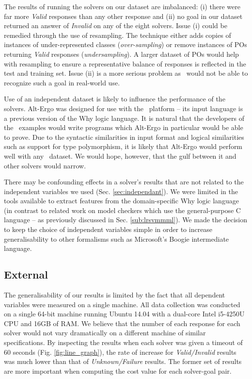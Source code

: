 The results of running the solvers on our dataset are imbalanced: (i) there were far more \textit{Valid} responses than any other response and (ii) no goal in our dataset returned an answer of \textit{Invalid} on any of the eight solvers. 
Issue (i) could be remedied through the use of resampling.
The technique either adds copies of instances of under-represented classes (\textit{over-sampling}) or remove instances of POs returning \textit{Valid} responses (\textit{undersampling}).
A larger dataset of POs would help with resampling to ensure a representative balance of responses is reflected in the test and training set. 
Issue (ii) is a more serious problem as \where~would not be able to recognize such a goal in real-world use. 

Use of an independent dataset is likely to influence the performance of the solvers. 
Alt-Ergo was designed for use with the \why~platform -- its input language is a previous version of the Why logic language. 
It is natural that the developers of the \why~examples would write programs which Alt-Ergo in particular would be able to prove. 
Due to the syntactic similarities in input format and logical similarities such as support for type polymorphism, it is likely that Alt-Ergo would perform well with any \why~dataset. We would hope, however, that the gulf between it and other solvers would narrow.

There may be confounding effects in a solver's results that are not related to the independent variables we used (Sec. \ref{sec:independant}). 
We were limited in the tools available to extract features from the domain-specific Why logic language (in contrast to related work on model checkers which use the general-purpose C language \cite{DPVZ15:CAV, MUX} -- as previously discussed in Sec. \ref{sub:lrsvmmml}). 
We made the decision to keep the choice of independent variables simple in order to increase generalisability to other formalisms such as Microsoft's Boogie \cite{Boogie} intermediate language.  

\subsection{External}


The generalisability of our results is limited by the fact that all dependent variables were measured on a single machine.
All data collection was conducted on a single 64-bit machine running Ubuntu 14.04 with a dual-core Intel i5-4250U CPU and 16GB of RAM. 
We believe that the number of each response for each solver would not vary dramatically on a different machine of similar specifications. 
By inspecting the results when each solver was given a timeout of 60 seconds (Fig. \ref{fig:line_graph}), the rate of increase for \textit{Valid/Invalid} results was much lower than that of \textit{Unknown/Failure} results. 
The former set of results are more important when computing the cost value for each solver-goal pair.

